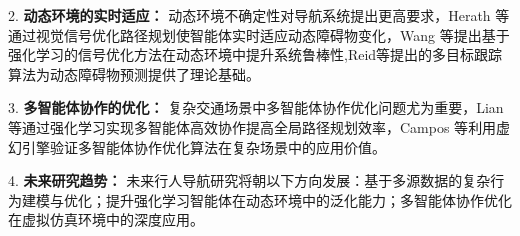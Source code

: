 2. \textbf{动态环境的实时适应：} 动态环境不确定性对导航系统提出更高要求，Herath 等\cite{herath2020ronin}通过视觉信号优化路径规划使智能体实时适应动态障碍物变化，Wang 等\cite{wang2013densetrajectory}提出基于强化学习的信号优化方法在动态环境中提升系统鲁棒性,Reid等\cite{reid1980tracking}提出的多目标跟踪算法为动态障碍物预测提供了理论基础。

3. \textbf{多智能体协作的优化：} 复杂交通场景中多智能体协作优化问题尤为重要，Lian 等\cite{lian2023inverseql}通过强化学习实现多智能体高效协作提高全局路径规划效率，Campos 等\cite{campos2021orbslam3}利用虚幻引擎验证多智能体协作优化算法在复杂场景中的应用价值。

4. \textbf{未来研究趋势：} 未来行人导航研究将朝以下方向发展：基于多源数据的复杂行为建模与优化；提升强化学习智能体在动态环境中的泛化能力；多智能体协作优化在虚拟仿真环境中的深度应用。
